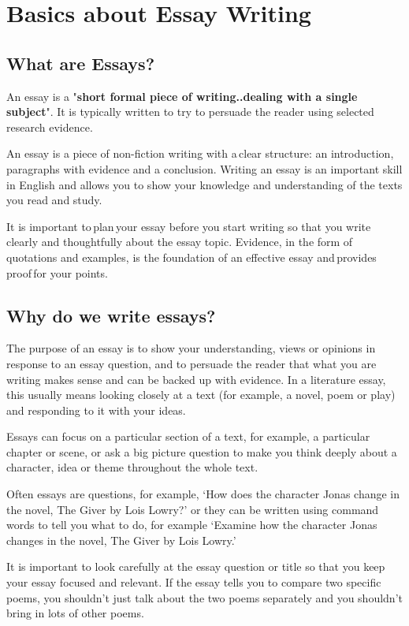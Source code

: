 \chapter{Basics about Essay Writing}

\section{What are Essays?}
An essay is a "\textbf{short formal piece of writing..dealing with a single subject}". It is typically written to try to persuade the reader using selected research evidence.

An essay is a piece of non-fiction writing with a clear structure: an introduction, paragraphs with evidence and a conclusion. Writing an essay is an important skill in English and allows you to show your knowledge and understanding of the texts you read and study.

It is important to plan your essay before you start writing so that you write clearly and thoughtfully about the essay topic. Evidence, in the form of quotations and examples, is the foundation of an effective essay and provides proof for your points.

\section{Why do we write essays?}
The purpose of an essay is to show your understanding, views or opinions in response to an essay question, and to persuade the reader that what you are writing makes sense and can be backed up with evidence. In a literature essay, this usually means looking closely at a text (for example, a novel, poem or play) and responding to it with your ideas.

Essays can focus on a particular section of a text, for example, a particular chapter or scene, or ask a big picture question to make you think deeply about a character, idea or theme throughout the whole text.

Often essays are questions, for example, ‘How does the character Jonas change in the novel, The Giver by Lois Lowry?’ or they can be written using command words to tell you what to do, for example ‘Examine how the character Jonas changes in the novel, The Giver by Lois Lowry.’

It is important to look carefully at the essay question or title so that you keep your essay focused and relevant. If the essay tells you to compare two specific poems, you shouldn’t just talk about the two poems separately and you shouldn’t bring in lots of other poems.

